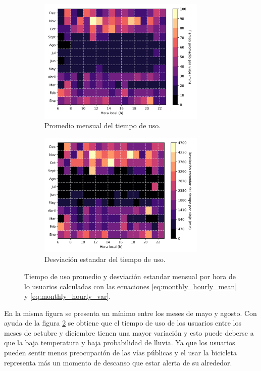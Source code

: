 \begin{figure}[H]
    \centering
    \begin{subfigure}[b]{8cm}
        \includegraphics[width=8cm]{Graphics/monthly_hourly_mean_time_travel.png}
        \caption{Promedio mensual del tiempo de uso.}
        \label{fig:monthly_hourly_mean_time}
    \end{subfigure}
    \begin{subfigure}[b]{8cm}
        \includegraphics[width=8cm]{Graphics/monthly_hourly_var_time_travel.png}
        \caption{Desviación estandar del tiempo de uso.}
        \label{fig:monthly_hourly_var_time}
    \end{subfigure}
    \caption{Tiempo de uso promedio y desviación estandar mensual por hora de lo usuarios calculadas con las ecuaciones \ref{eq:monthly_hourly_mean} y \ref{eq:monthly_hourly_var}.}
    \label{fig:monthly_hourly_time}
\end{figure}

En la misma figura se presenta un mínimo entre los meses de mayo y agosto. Con ayuda de la figura \ref{fig:monthly_hourly_var_time} se obtiene que el tiempo de uso de los usuarios entre los meses de octubre y diciembre tienen una mayor variación y esto puede deberse a que la baja temperatura y baja probabilidad de lluvia\cite{clima_guadalajara}. Ya que los usuarios pueden sentir menos preocupación de las vías públicas y el usar la bicicleta representa más un momento de descanso que estar alerta de su alrededor.


